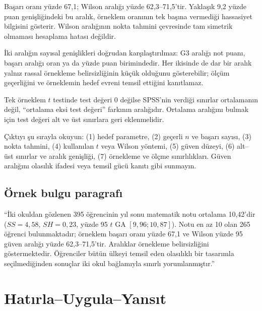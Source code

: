 Başarı oranı yüzde 67,1; Wilson aralığı yüzde 62,3--71,5'tir. Yaklaşık 9,2
yüzde puan genişliğindeki bu aralık, örneklem oranının tek başına vermediği
hassasiyet bilgisini gösterir. Wilson aralığının nokta tahmini çevresinde tam
simetrik olmaması hesaplama hatası değildir.

İki aralığın sayısal genişlikleri doğrudan karşılaştırılmaz: G3 aralığı not
puanı, başarı aralığı oran ya da yüzde puan birimindedir. Her ikisinde de dar
bir aralık yalnız rassal örnekleme belirsizliğinin küçük olduğunu gösterebilir;
ölçüm geçerliğini ve örneklemin hedef evreni temsil ettiğini kanıtlamaz.

\begin{mistakebox}
Tek örneklem $t$ testinde test değeri 0 değilse SPSS'nin verdiği sınırlar
ortalamanın değil, ``ortalama eksi test değeri'' farkının aralığıdır. Ortalama
aralığını bulmak için test değeri alt ve üst sınırlara geri eklenmelidir.
\end{mistakebox}

\begin{outputguidebox}
Çıktıyı şu sırayla okuyun: (1) hedef parametre, (2) geçerli $n$ ve başarı
sayısı, (3) nokta tahmini, (4) kullanılan $t$ veya Wilson yöntemi, (5) güven
düzeyi, (6) alt--üst sınırlar ve aralık genişliği, (7) örnekleme ve ölçme
sınırlılıkları. Güven aralığını olasılık ifadesi veya temsil gücü kanıtı gibi
sunmayın.
\end{outputguidebox}

\subsection{Örnek bulgu paragrafı}

``İki okuldan gözlenen 395 öğrencinin yıl sonu matematik notu ortalama
10,42'dir ($SS=4{,}58$, $SH=0{,}23$, yüzde 95 $t$ GA
$[9{,}96;10{,}87]$). Notu en az 10 olan 265 öğrenci bulunmaktadır; örneklem
başarı oranı yüzde 67,1 ve Wilson yüzde 95 güven aralığı yüzde
62,3--71,5'tir. Aralıklar örnekleme belirsizliğini göstermektedir. Öğrenciler
bütün ülkeyi temsil eden olasılıklı bir tasarımla seçilmediğinden sonuçlar iki
okul bağlamıyla sınırlı yorumlanmıştır.''




\section*{Hatırla--Uygula--Yansıt}

